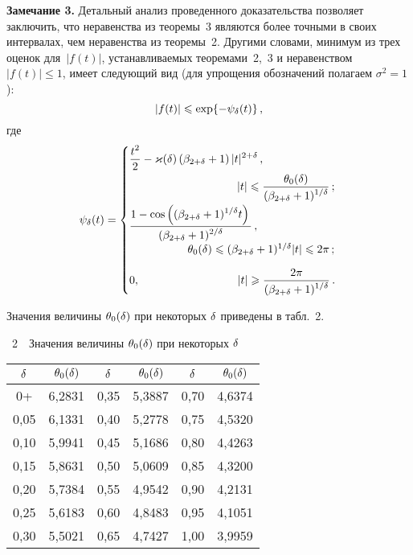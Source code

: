 \begin{multicols}{2}
\noindent
\textbf{Замечание 3.}
Детальный анализ проведенного доказательства позволяет заключить,
что неравенства из теоремы~3 являются более точными в
своих интервалах, чем неравенства из теоремы~2. Другими
словами, минимум из трех оценок для~$|f(t)|$, уста\-нав\-ли\-ва\-емых
теоремами~2,~3 и неравенством $|f(t)|\le1$,
имеет следующий вид (для упрощения обозначений полагаем
$\sigma^2=1$):
$$
|f(t)|\leqslant \exp\{-\psi_\delta(t)\}\,,
$$
где
$$
\psi_\d(t)=
\begin{cases}
\fr{t^2}{2}-\varkappa(\d)\left(\beta_{2+\d}+
 1\right)|t|^{2+\d}\,, \\[6pt]
 \hspace*{96pt}  |t|\le\fr{\theta_0(\d)}{(\bet+1)^{1/\d}}\,;\hspace*{-8pt} \\[9pt]
\fr{1-\cos\left((\bet+1)^{1/\d}t\right)}{(\beta_{2+\d}+1)^{2/\d}}\,, \\[6pt]
\hspace*{52pt} \theta_0(\d)\le (\bet+1)^{1/\d}|t|  \le2\pi\,; \hspace*{-8pt}\\[9pt]
  0,  \hspace*{87pt}|t|\ge\fr{2\pi}{(\bet+1)^{1/\d}}\,.\hspace*{-8pt}
\end{cases}
$$

\medskip

Значения величины $\theta_0(\delta)$ при некоторых $\delta$ приведены в
табл.~2.


\bigskip

\begin{center}
\noindent
{{\tablename~2}\ \ \small{Значения величины $\theta_0(\delta)$ при некоторых $\delta$}}
\end{center}

\begin{center}
\tabcolsep=6.3pt
\begin{tabular}{|c|c||c|c||c|c|}
\hline
$\delta$ &$ \theta_0(\delta)$ &$ \delta$ &$ \theta_0(\delta)$ &$ \delta$ &$ \theta_0(\delta)$\\
\hline
0+   & 6,2831 & 0,35 & 5,3887 & 0,70 & 4,6374  \\
0,05 & 6,1331 & 0,40 & 5,2778  & 0,75 & 4,5320  \\
0,10 & 5,9941 & 0,45 & 5,1686 & 0,80 &  4,4263  \\
0,15 & 5,8631 & 0,50 & 5,0609  & 0,85 &  4,3200 \\
0,20 & 5,7384 & 0,55 & 4,9542  & 0,90 & 4,2131  \\
0,25 & 5,6183 & 0,60 & 4,8483  & 0,95 &  4,1051 \\
0,30 & 5,5021 & 0,65 &  4,7427  & 1,00 & 3,9959  \\
\hline
\end{tabular}
\end{center}



\end{multicols}
